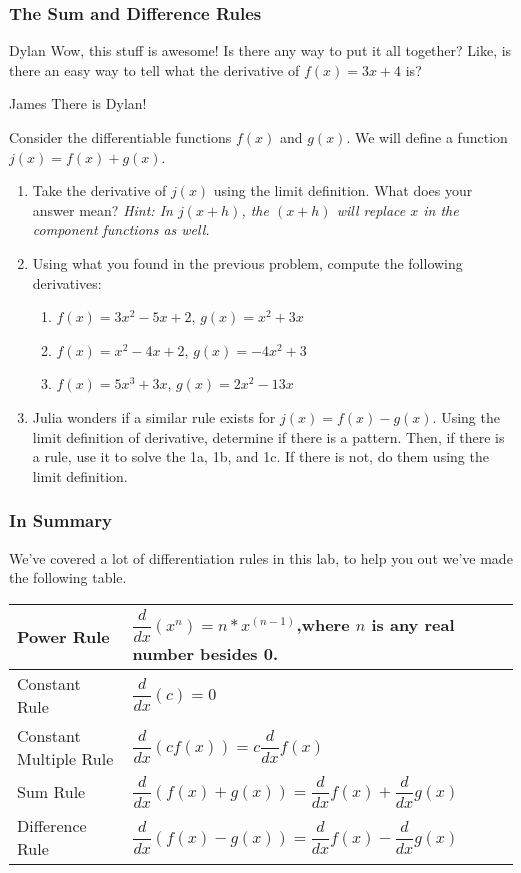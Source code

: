 \documentclass{ximera}
\begin{document}
\subsubsection{The Sum and Difference Rules}
\begin{dialogue}
\item[Dylan] Wow, this stuff is awesome! Is there any way to put it all together? Like, is there an easy way to tell what the derivative of $f(x) = 3x+4$ is?
\item[James] There is Dylan! 
\end{dialogue}
Consider the differentiable functions $f(x)$ and $g(x)$. We will define a function $j(x) = f(x) + g(x)$.
\begin{enumerate}
\item{Take the derivative of $j(x)$ using the limit definition. What does your answer mean? \textit{Hint: In $j(x+h)$, the $(x+h)$ will replace $x$ in the component functions as well.}}
\item{Using what you found in the previous problem, compute the following derivatives:
\begin{enumerate}
\item{$f(x) = 3x^2 - 5x + 2$, $g(x) = x^2 + 3x$}
\item{$f(x) = x^2 - 4x + 2$, $g(x) = -4x^2 + 3$}
\item{$f(x) = 5x^3 + 3x$, $g(x) = 2x^2 - 13x$}
\end{enumerate}
}
\item{Julia wonders if a similar rule exists for $j(x) = f(x)-g(x)$. Using the limit definition of derivative, determine if there is a pattern. Then, if there is a rule, use it to solve the 1a, 1b, and 1c. If there is not, do them using the limit definition.}
\end{enumerate}

\subsubsection{In Summary}
We've covered a lot of differentiation rules in this lab, to help you out we've made the following table.
\begin{center}
{\renewcommand{\arraystretch}{3}
\begin{tabular}{| l | p{7.5cm} |}
    \hline
    Power Rule & $\displaystyle \dfrac{d}{dx}(x^n)=n*x^{(n-1)}$,where $n$ is any real number besides 0. \\
    \hline
    Constant Rule & $\displaystyle\dfrac{d}{dx}(c) = 0$ \\
    \hline
    Constant Multiple Rule & $\displaystyle\dfrac{d}{dx}(cf(x))=c\dfrac{d}{dx}f(x)$ \\
    \hline
    Sum Rule & $\displaystyle\dfrac{d}{dx}(f(x)+g(x))=\dfrac{d}{dx}f(x)+\dfrac{d}{dx}g(x)$ \\
    \hline
    Difference Rule & $\displaystyle\dfrac{d}{dx}(f(x)-g(x))=\dfrac{d}{dx}f(x)-\dfrac{d}{dx}g(x)$ \\
    \hline
\end{tabular}}
\end{center}
\pagebreak
\end{document}
